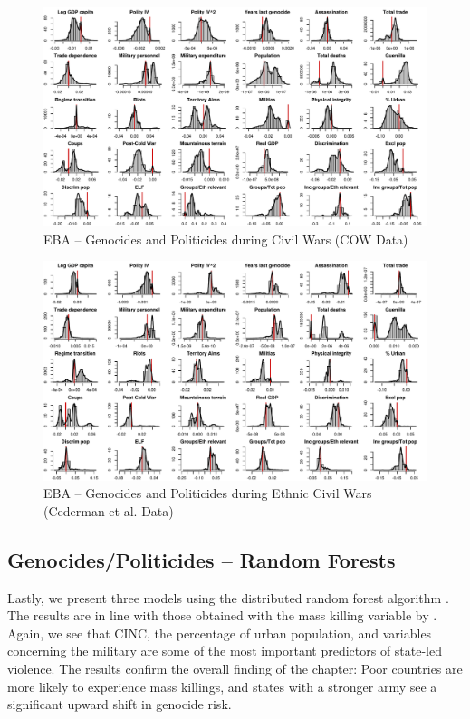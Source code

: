 \clearpage
\begin{figure}
    \centering
    \includegraphics[width=\textwidth]{images/uamk-cow.pdf}
    \caption{EBA -- Genocides and Politicides during Civil Wars (COW Data)}
    \label{fig:uamk-cow}
\end{figure}
\clearpage

\clearpage
\begin{figure}
    \centering
    \includegraphics[width=\textwidth]{images/uamk-eth.pdf}
    \caption{EBA -- Genocides and Politicides during Ethnic Civil Wars (Cederman et al. Data)}
    \label{fig:uamk-eth}
\end{figure}
\clearpage

\newpage
\subsection{Genocides/Politicides -- Random Forests}

Lastly, we present three models using the distributed random forest algorithm \citep{h2o2017}. The results are in line with those obtained with the mass killing variable by  \citet{ulfelder2008assessing}. Again, we see that CINC, the percentage of urban population, and variables concerning the military are some of the most important predictors of state-led violence. The results confirm the overall finding of the chapter: Poor countries are more likely to experience mass killings, and states with a stronger army see a significant upward shift in genocide risk.

